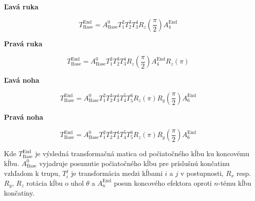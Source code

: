 \noindent
\textbf{Ľavá ruka}

\begin{equation}
T_{\text{Base}}^{\text{End}} = A_{\text{Base}}^{0} T_{1}^{2} T_{2}^{3} T_{3}^{4} R_{z}\left(\frac{\pi}{2}\right) A_{4}^{\text{End}}
\end{equation}

\noindent
\textbf{Pravá ruka}

\begin{equation}
T_{\text{Base}}^{\text{End}} = A_{\text{Base}}^{0} T_{1}^{2} T_{2}^{3} T_{3}^{4} R_{z}\left(\frac{\pi}{2}\right) A_{4}^{\text{End}} R_{z}\left(\pi\right)
\end{equation}

\noindent
\textbf{Ľavá noha}

\begin{equation}
T_{\text{Base}}^{\text{End}} = A_{\text{Base}}^{0} T_{1}^{2} T_{2}^{3} T_{3}^{4} T_{4}^{5} T_{5}^{6} R_{z}\left(\pi\right) R_{y}\left(\frac{\pi}{2}\right) A_{6}^{\text{End}}
\end{equation}

\noindent
\textbf{Pravá noha}

\begin{equation}
T_{\text{Base}}^{\text{End}} = A_{\text{Base}}^{0} T_{1}^{2} T_{2}^{3} T_{3}^{4} T_{4}^{5} T_{5}^{6} R_{z}\left(\pi\right) R_{y}\left(\frac{\pi}{2}\right) A_{6}^{\text{End}} 
\end{equation}

Kde $T_{\text{Base}}^{\text{End}}$ je výsledná transformačná matica od počiatočného kĺbu ku koncovému kĺbu. $A_{\text{Base}}^{0}$ vyjadruje posunutie počiatočného kĺbu pre príslušnú končatinu vzhľadom k trupu, $T_{i}^{j}$ je transformácia medzi kĺbami $i$ a $j$ v postupnosti, $R_x$ resp. $R_y$, $R_z$ rotácia kĺbu o uhol $\theta$ a $A_{n}^{\text{End}}$ posun koncového efektora oproti $n$-tému kĺbu končatiny.
